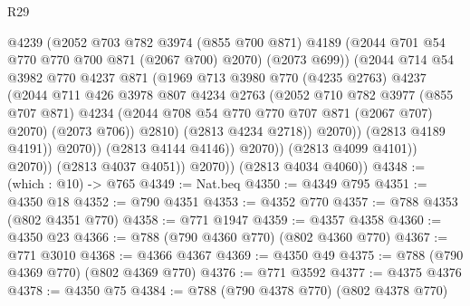 \begin{lexlean}{R29}
\begin{coremodule}
                                @4239
                                (@2052
                                  @703
                                  @782
                                  @3974
                                  (@855 @700 @871)
                                  @4189
                                  (@2044 @701 @54 @770 @770 @700 @871 (@2067 @700) @2070)
                                  (@2073 @699))
                                (@2044
                                  @714
                                  @54
                                  @3982
                                  @770
                                  @4237
                                  @871
                                  (@1969
                                    @713
                                    @3980
                                    @770
                                    (@4235 @2763)
                                    @4237
                                    (@2044
                                      @711
                                      @426
                                      @3978
                                      @807
                                      @4234
                                      @2763
                                      (@2052
                                        @710
                                        @782
                                        @3977
                                        (@855 @707 @871)
                                        @4234
                                        (@2044 @708 @54 @770 @770 @707 @871 (@2067 @707) @2070)
                                        (@2073 @706))
                                      @2810)
                                    (@2813 @4234 @2718))
                                  @2070))
                              (@2813 @4189 @4191))
                            @2070))
                        (@2813 @4144 @4146))
                      @2070))
                  (@2813 @4099 @4101))
                @2070))
            (@2813 @4037 @4051))
          @2070))
      (@2813 @4034 @4060))
@4348 := (which : @10) -> @765
@4349 := Nat.beq
@4350 := @4349 @795
@4351 := @4350 @18
@4352 := @790 @4351
@4353 := @4352 @770
@4357 := @788 @4353 (@802 @4351 @770)
@4358 := @771 @1947
@4359 := @4357 @4358
@4360 := @4350 @23
@4366 := @788 (@790 @4360 @770) (@802 @4360 @770)
@4367 := @771 @3010
@4368 := @4366 @4367
@4369 := @4350 @49
@4375 := @788 (@790 @4369 @770) (@802 @4369 @770)
@4376 := @771 @3592
@4377 := @4375 @4376
@4378 := @4350 @75
@4384 := @788 (@790 @4378 @770) (@802 @4378 @770)

\end{coremodule}
\end{lexlean}
